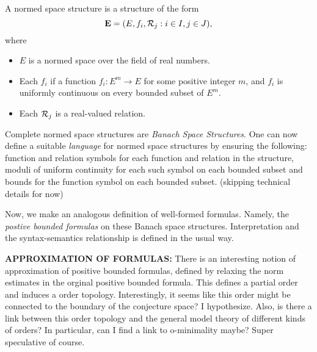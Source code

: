 \begin{definition}
    A normed space structure is a structure of the form
    \begin{equation*}
        \mathbf{E} = (E, f_i, \mathcal{R}_j : i\in I, j\in J),
    \end{equation*}
    where
    \begin{itemize}
        \item $E$ is a normed space over the field of real numbers.
        \item Each $f_i$ if a function $f_i : E^m\rightarrow E$ for some positive integer $m$, and $f_i$ is uniformly continuous on every bounded subset of $E^m$.
        \item Each $\mathcal{R}_j$ is a real-valued relation.
    \end{itemize}
\end{definition}

Complete normed space structures are \textit{Banach Space Structures}. One can now define a suitable \textit{language} for normed space structures by
ensuring the following: function and relation symbols for each function and relation in the structure, moduli of uniform continuity for each such symbol on each bounded subset
and bounds for the function symbol on each bounded subset. (skipping technical details for now)


Now, we make an analogous definition of well-formed formulas. Namely, the \textit{postive bounded formulas} on these Banach space structures. Interpretation and the syntax-semantics
relationship is defined in the usual way.

\begin{remark}
    \textbf{APPROXIMATION OF FORMULAS: } There is an interesting notion of approximation of positive bounded formulas, defined by relaxing the norm estimates in the orginal positive bounded formula.
    This defines a partial order and induces a order topology. Interestingly, it seems like this order might be connected to the boundary of the conjecture space? I hypothesize. Also, is there a link between this order topology
    and the general model theory of different kinds of orders? In particular, can I find a link to o-minimality maybe? Super speculative of course.
\end{remark}

